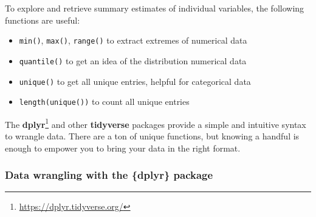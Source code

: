 \documentclass[
]{krantz}
\makeatletter
\newenvironment{Shaded}{\begin{snugshade}}{\end{snugshade}}
\newcommand{\DocumentationTok}[1]{\textcolor[rgb]{0.37,0.37,0.37}{\textbf{\textit{#1}}}}
\newcommand{\FunctionTok}[1]{\textcolor[rgb]{0,0,0}{#1}}
\newcommand{\NormalTok}[1]{#1}
\newcommand{\SpecialCharTok}[1]{\textcolor[rgb]{0,0,0}{#1}}
\providecommand{\tightlist}{%
  \setlength{\itemsep}{0pt}\setlength{\parskip}{0pt}}
\renewcommand{\href}[2]{#2\footnote{\url{#1}}}
\newenvironment{kframe}{%
\medskip{}
\setlength{\fboxsep}{.8em}
 \def\at@end@of@kframe{}%
 \ifinner\ifhmode%
  \def\at@end@of@kframe{\end{minipage}}%
  \begin{minipage}{\columnwidth}%
 \fi\fi%
 \def\FrameCommand##1{\hskip\@totalleftmargin \hskip-\fboxsep
 \colorbox{shadecolor}{##1}\hskip-\fboxsep
     \hskip-\linewidth \hskip-\@totalleftmargin \hskip\columnwidth}%
 \MakeFramed {\advance\hsize-\width
   \@totalleftmargin\z@ \linewidth\hsize
   \@setminipage}}%
 {\par\unskip\endMakeFramed%
 \at@end@of@kframe}
\renewenvironment{Shaded}{\begin{kframe}}{\end{kframe}}
\makeatother
\begin{document}
To explore and retrieve summary estimates of individual variables, the following functions are useful:

\begin{itemize}
\tightlist
\item
  \texttt{min()}, \texttt{max()}, \texttt{range()} to extract extremes of numerical data
\item
  \texttt{quantile()} to get an idea of the distribution numerical data
\item
  \texttt{unique()} to get all unique entries, helpful for categorical data
\item
  \texttt{length(unique())} to count all unique entries
\end{itemize}

\begin{Shaded}
\end{Shaded}

The \href{https://dplyr.tidyverse.org/}{\textbf{dplyr}} \citep{dplyr} and other \textbf{tidyverse} packages provide a simple and intuitive syntax to wrangle data. There are a ton of unique functions, but knowing a handful is enough to empower you to bring your data in the right format.

\hypertarget{dplyr}{%
\subsubsection{Data wrangling with the \{dplyr\} package}\label{dplyr}}
\end{document}

